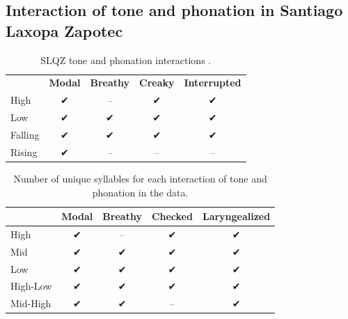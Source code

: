 \documentclass[12pt, letterpaper]{article}
\providecommand{\lsptoprule}{\midrule\toprule}
\providecommand{\lspbottomrule}{\bottomrule\midrule}
\begin{document}

\subsection{Interaction of tone and phonation in Santiago Laxopa Zapotec} \label{sec:TonePhonation}

\begin{table}[!ht]
	\centering
	\caption{SLQZ tone and phonation interactions \citep{chavez-peonInteractionMetricalStructure2010}.}
	\label{tab:SLQZ}
	 \begin{tabular}{lcccc}
	  \lsptoprule
					  &	 \textbf{Modal}  & \textbf{Breathy} & \textbf{Creaky} & \textbf{Interrupted} \\
		  High	& ✔︎ & -- & ✔︎ & ✔︎ \\
		  Low & ✔︎ & ✔︎ & ✔︎ & ✔︎ \\
		  Falling & ✔︎ & ✔︎ & ✔︎ & ✔︎ \\
		  Rising & ✔︎ & -- & -- & -- \\
	  \lspbottomrule
	 \end{tabular}
\end{table}

\begin{table}[!h]
	\caption{Number of unique syllables for each interaction of tone and phonation in the data.}
	\label{tab:ToneVoiceQuality}
	\centering

	\begin{tabular}{lcccc}
	\lsptoprule
		& \textbf{Modal} & \textbf{Breathy} & \textbf{Checked} & \textbf{Laryngealized} \\
	\hline
	High		& ✔︎ & -- & ✔︎ & ✔︎ \\
	Mid			& ✔︎ & ✔︎  & ✔︎ & ✔︎ \\
	Low			& ✔︎ & ✔︎  & ✔︎ & ✔︎ \\
	High-Low	& ✔︎ & ✔︎  & ✔︎ & ✔︎ \\
	Mid-High	& ✔︎ & ✔︎  & --	& ✔︎ \\
	\lspbottomrule
	\end{tabular}
\end{table}
\end{document}
